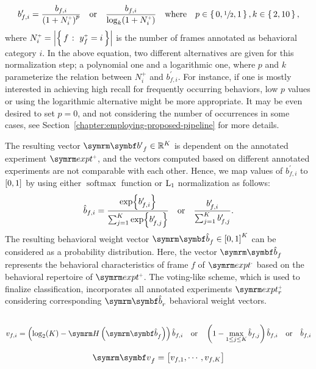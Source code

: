 \begin{equation}
	b^\prime_{f,i} = \frac{b_{f,i}}{\rbr{1 + N^{\plus}_i}^p} \qbor \frac{b_{f,i}}{\log_k(1 + N^{\plus}_i)} \qbwhere p \in \set{0, \sfrac{1}{2}, 1}, k \in \set{2, 10},
\end{equation}
where $N^{\plus}_i = \card*{\Set{f}{y^{\plus}_f=i}}$ is the number of frames annotated as behavioral category $i$.
In the above equation, two different alternatives are given for this normalization step; a polynomial one and a logarithmic one, where $p$ and $k$ parameterize the relation between $N^{\plus}_i$ and $b^\prime_{f,i}$.
For instance, if one is mostly interested in achieving high recall for frequently occurring behaviors, low $p$ values or using the logarithmic alternative might be more appropriate.
It may be even desired to set $p=0$, and not considering the number of occurrences in some cases, see Section~\ref{chapter:employing-proposed-pipeline} for more details.

The resulting vector $\V{b^{\prime}}_f \in \reals^K$ is dependent on the annotated experiment $\exptAnn$, and the vectors computed based on different annotated experiments are not comparable with each other.
Hence, we map values of $b^\prime_{f,i}$ to $\left[0,1\right]$ by using either $\operatorname {softmax}$ function or $\textnormal{L}_1$ normalization as follows:
\begin{equation}
	\hat{b}_{f,i} = \frac{\exp{b^\prime_{f,i}}}{\sum_{j=1}^{K} \exp{b^\prime_{f,j}}} \quad \textnormal{or} \quad \frac{b^\prime_{f,i}}{\sum_{j=1}^{K} b^\prime_{f,j}}.
\end{equation}
The resulting behavioral weight vector $\V{\hat{b}}_f \in \sqbr{0,1}^K$ can be considered as a probability distribution.
Here, the vector $\V{\hat{b}}_f$ represents the behavioral characteristics of frame $f$ of $\exptUnann$ based on the behavioral repertoire of $\exptAnn$.
The voting-like scheme, which is used to finalize classification, incorporates all annotated experiments $\exptAnn_r$ considering corresponding $\V{\hat{b}}_r$ behavioral weight vectors.

\subsection{}

\begin{equation}
	v_{f,i} = \rbr{\log_2(K) - \entropy{\V{\hat{b}}_f}} \hat{b}_{f,i} \qbor \rbr{ 1 - \max_{1 \leq j \leq K} \hat{b}_{f,j}} \hat{b}_{f,i} \qbor \hat{b}_{f,i}
\end{equation}

\begin{equation}
	\V{v}_f = \qmatrix{v_{f,1}, \cdots, v_{f,K}}
\end{equation}
